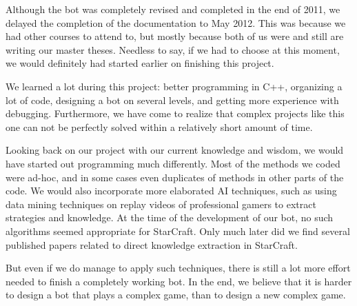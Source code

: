 Although the bot was completely revised and completed in the end of 2011, we delayed the completion of the documentation to May 2012. This was because we had other courses to attend to, but mostly because both of us were and still are writing our master theses. Needless to say, if we had to choose at this moment, we would definitely had started earlier on finishing this project. 

We learned a lot during this project: better programming in C++, organizing a lot of code, designing a bot on several levels, and getting more experience with debugging. Furthermore, we have come to realize that complex projects like this one can not be perfectly solved within a relatively short amount of time.

Looking back on our project with our current knowledge and wisdom, we would have started out programming much differently. Most of the methods we coded were ad-hoc, and in some cases even duplicates of methods in other parts of the code. We would also incorporate more elaborated AI techniques, such as using data mining techniques on replay videos of professional gamers to extract strategies and knowledge. At the time of the development of our bot, no such algorithms seemed appropriate for StarCraft. Only much later did we find several published papers related to direct knowledge extraction in StarCraft.

But even if we do manage to apply such techniques, there is still a lot more effort needed to finish a completely working bot. In the end, we believe that it is harder to design a bot that plays a complex game, than to design a new complex game.







%
